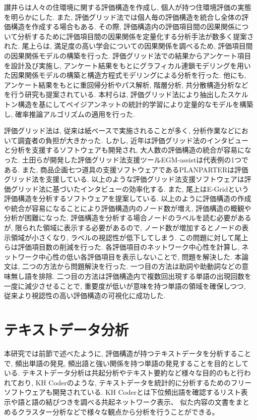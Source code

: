 \documentclass[syuuron]{kuee}
\begin{document}
		讃井らは人々の住環境に関する評価構造を作成し, 個人が持つ住環境評価の実態を明らかにした. 
		また, 評価グリッド法では個人毎の評価構造を統合し全体の評価構造を作成する場合もある. 
		その際, 評価構造内の評価項目間の因果関係について分析するために評価項目間の因果関係を定量化する分析手法が数多く提案された. 
		尾上らは, 満足度の高い学会についての因果関係を調べるため, 評価項目間の因果関係モデルの構築を行った\cite{egm8}. 
		評価グリッド法での結果からアンケート項目を設計及び実施し, アンケート結果をもとにグラフィカル連鎖モデリングを用いた因果関係モデルの構築と構造方程式モデリングによる分析を行った. 
		他にも, アンケート結果をもとに重回帰分析やパス解析, 階層分析, 共分散構造分析などを行う研究も提案されている. 
		本村らは, 評価グリッド法により抽出したスケルトン構造を基にしてベイジアンネットの統計的学習により定量的なモデルを構築し, 確率推論アルゴリズムの適用を行った\cite{egm9}. 
		
		評価グリッド法は, 従来は紙ベースで実施されることが多く, 分析作業などにおいて調査者の負担が大きかった. 
		しかし, 近年は評価グリッド法のインタビューと分析を支援するソフトウェアも開発され, 大人数の評価構造の統合が容易になった. 
		土田らが開発した評価グリッド法支援ツールEGM-assistは代表例の1つである\cite{egm11}. 
		また, 商品企画七つ道具の支援ソフトウェアであるPLANPARTERは評価グリッド法を支援している\cite{egm12}. 
		以上のような評価グリッド法支援ソフトウェアは評価グリッド法に基づいたインタビューの効率化する. 
		また, 尾上はE-Gridという評価構造を分析するソフトウェアを提案している. 
		以上のように評価構造の作成や統合が容易になることにより評価構造内のノード数が増え, 評価構造の概観や分析が困難になった. 
		評価構造を分析する場合ノードのラベルを読む必要があるが, 限られた領域に表示する必要があるので, 
		ノード数が増加するとノードの表示領域が小さくなり, ラベルの視認性が低下してしまう. 
		この問題に対して尾上らは評価項目数の削減を行った\cite{net1}. 
		各評価項目のネットワーク中心性を計算し, ネットワーク中心性の低い各評価項目を表示しないことで, 問題を解決した. 
		本論文は, 二つの方法から問題解決を行った. 
		一つ目の方法は助詞や助動詞などの意味無し語を排除. 二つ目の方法は評価構造内で複数回出現する単語の出現回数を一度に減少させることで, 
		重要度が低いが意味を持つ単語の領域を確保しつつ, 従来より視認性の高い評価構造の可視化に成功した. 
		
	\section{テキストデータ分析}
		本研究では前節で述べたように, 評価構造が持つテキストデータを分析することで, 
		頻出単語の発見, 頻出語と強い関係を持つ単語の発見することを目的としている.  
		テキストデータ分析は共起分析やテキスト要約など様々な目的のもと行われており, 
		KH Coderのような, テキストデータを統計的に分析するためのフリーソフトウェアも開発されている. 
		KH Coderとは下位頻出語を確認するリスト表示や語と語の結びつきを調べる共起ネットワーク表示、
		似た内容の文書をまとめるクラスター分析などで様々な観点から分析を行うことができる。
		
\end{document}
